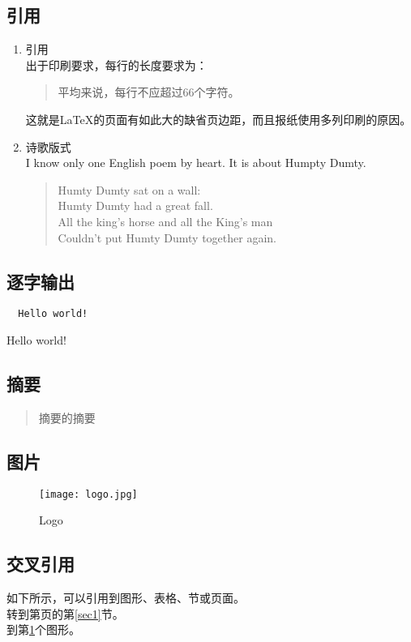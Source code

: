 \documentclass[12pt]{article}
\begin{document}
\subsection{引用}
\begin{enumerate}
	\item 引用\\
	出于印刷要求，每行的长度要求为：
	\begin{quote}
		平均来说，每行不应超过66个字符。
	\end{quote}
	这就是\LaTeX{}的页面有如此大的缺省页边距，而且报纸使用多列印刷的原因。
	\item 诗歌版式\\
	I know only one English poem by heart. It is about Humpty Dumty.
	\begin{flushleft}
		\begin{verse}
			Humty Dumty sat on a wall:\\
			Humty Dumty had a great fall.\\
			All the king's horse and all the King's man\\
			Couldn't put Humty Dumty together again.
		\end{verse}
	\end{flushleft}
\end{enumerate}
\subsection{逐字输出}
\begin{verbatim}
  Hello world!
\end{verbatim}
Hello world!
\subsection{摘要}
\begin{abstract}
	摘要的摘要\label{abs}
\end{abstract}
\subsection{图片}
\begin{figure}[!htp]
	\centering
	\texttt{[image: logo.jpg]}
	\caption{Logo}\label{logo}
\end{figure} %
\subsection{交叉引用}
如下所示，可以引用到图形、表格、节或页面。\\
转到第\pageref{sec1}页的第\ref{sec1}节。\\
到第\ref{logo}个图形。
\end{document}
